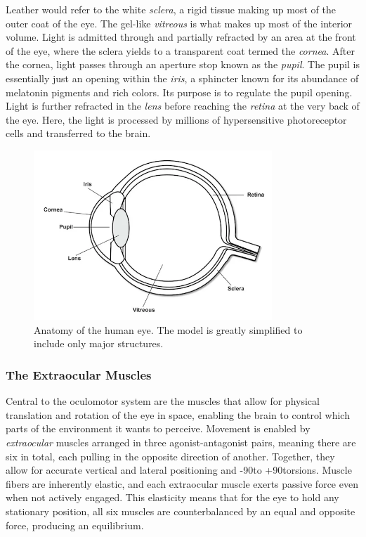 Leather would refer to the white \textit{sclera}, a rigid tissue making up most of the outer coat of the eye. The gel-like \textit{vitreous} is what makes up most of the interior volume. Light is admitted through and partially refracted by an area at the front of the eye, where the sclera yields to a transparent coat termed the \textit{cornea}. After the cornea, light passes through an aperture stop known as the \textit{pupil}. The pupil is essentially just an opening within the \textit{iris}, a sphincter known for its abundance of melatonin pigments and rich colors. Its purpose is to regulate the pupil opening. Light is further refracted in the \textit{lens} before reaching the \textit{retina} at the very back of the eye. Here, the light is processed by millions of hypersensitive photoreceptor cells and transferred to the brain. 

\begin{figure}[h]
    \centering
    \includegraphics[width=0.8\textwidth]{Images/bt_eye.png}
    \caption{Anatomy of the human eye. The model is greatly simplified to include only major structures.}
    \label{fig:bt_eye}
\end{figure}

\subsubsection{The Extraocular Muscles}

Central to the oculomotor system are the muscles that allow for physical translation and rotation of the eye in space, enabling the brain to control which parts of the environment it wants to perceive. Movement is enabled by \textit{extraocular} muscles arranged in three agonist-antagonist pairs, meaning there are six in total, each pulling in the opposite direction of another. Together, they allow for accurate vertical and lateral positioning and -90\degree to +90\degree torsions. Muscle fibers are inherently elastic, and each extraocular muscle exerts passive force even when not actively engaged. This elasticity means that for the eye to hold any stationary position, all six muscles are counterbalanced by an equal and opposite force, producing an equilibrium.

